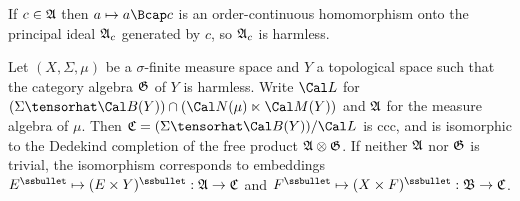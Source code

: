{If $c\in\frak A$ then $a\mapsto a\Bcap c$ is an order-continuous homomorphism onto the
principal ideal $\frak A_c$ generated by $c$, so $\frak A_c$ is harmless.
}%

 Let $(X,\Sigma,\mu)$ be a $\sigma$-finite measure
space and
$Y$ a topological space such that the category algebra $\frak G$ of $Y$ is
harmless.   Write $\Cal L$ for
 $(\Sigma\tensorhat\Cal B(Y))\cap(\Cal N(\mu)\ltimes\Cal M(Y))$ and
$\frak A$ for the measure algebra of $\mu$.   Then
$\frak C=(\Sigma\tensorhat\Cal B(Y))/\Cal L$
is ccc, and is isomorphic to the Dedekind completion of the
free product $\frak A\otimes\frak G$.
If neither $\frak A$ nor $\frak G$ is trivial,
the isomorphism corresponds to embeddings
$E^{\ssbullet}\mapsto(E\times Y)^{\ssbullet}:\frak A\to\frak C$ and
$F^{\ssbullet}\mapsto(X\times F)^{\ssbullet}:\frak B\to\frak C$.


